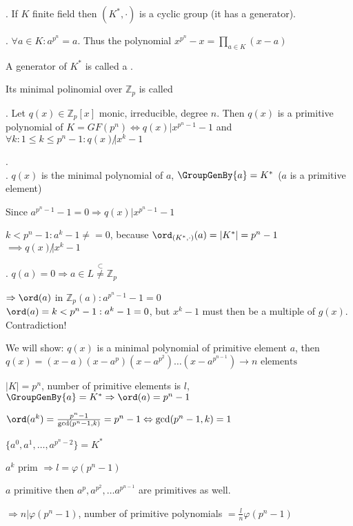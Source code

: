 \Theorem.
If $K$ finite field then $(K^{*},\cdot)$ is a cyclic group (it has a generator). 

\Corollary.
$\forall a \in K: a^{p^n} = a$. Thus the polynomial $x^{p^n} -x = \prod_{a\in K}(x-a)$ 

\begin{definition}
  A generator of $K^{*}$ is called a . 

  Its minimal polinomial over $\mathbb{Z}_p$ is called 
\end{definition}

\Theorem. 
Let $q(x) \in \mathbb{Z}_p[x]$ monic, irreducible, degree $n$. Then $q(x)$ is a primitive polynomial of $K = GF(p^n) \iff q(x) | x^{p^n -1}-1$ and $\forall k : 1 \leq k \leq p^n-1: q(x) \not| x^k-1$

\Proof. \\
\ProofForward.
$q(x)$ is the minimal polynomial of $a$, $\GroupGenBy{a} = K^{*}$ ($a$ is a primitive element)

Since $a^{p^n-1}-1 = 0 \Rightarrow q(x)|x^{p^n-1}-1$

$k < p^n-1: a^k -1 \neq = 0$, because $\ord_{(K^{*}, \cdot)} (a) = | K^{*}| = p^n-1$ \\
$\implies q(x) \not| x^k -1$

\ProofBackward.
$q(a) = 0 \Rightarrow a \in L \stackrel{\subset}{\neq} \mathbb{Z}_p$

$\Rightarrow \ord(a)$ in $\mathbb{Z}_p(a): a^{p^n-1}-1 = 0$ \\
$\ord(a) = k < p^n -1: a^k -1 = 0$, but $x^k-1$ must then be a multiple of $g(x)$. Contradiction!


We will show: $q(x)$ is a minimal polynomial of primitive element $a$, then $q(x) = (x- a)(x-a^p)(x-a^{p^2}) \ldots (x-a^{p^{n-1}}) \rightarrow n \text{ elements}$

$|K| = p^n$, number of primitive elements is $l$, $\GroupGenBy{a} = K^{*} \Rightarrow \ord(a) = p^n-1$

$\ord(a^k) = \frac{p^n-1}{\gcd(p^n-1,k)} = p^n-1 \Leftrightarrow \gcd(p^n-1,k) = 1$

$\{a^0, a^1, \ldots, a^{p^n-2}\} = K^{*}$

$a^k$ prim $\Rightarrow l = \varphi(p^n-1)$

$a$ primitive then $a^p, a^{p^2}, \ldots a^{p^{n-1}}$ are primitives as well.

$\Rightarrow n| \varphi(p^n-1)$, number of primitive polynomials $= \frac{l}{n} \varphi(p^n-1)$

